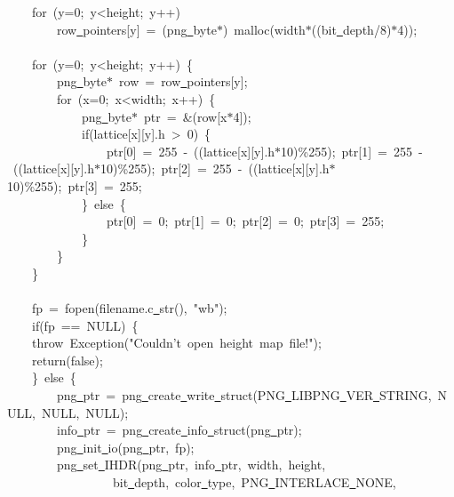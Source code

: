 {\ \ \ \ for\ (y=0;\ y<{}height;\ y++)\\
\ \ \ \ \ \ \ \ row\underline\ pointers[y]\ =\ (png\underline\ byte$\ast$)\ malloc(width$\ast$((bit\underline\ depth/8)$\ast$4));\\
\ \\
\ \ \ \ for\ (y=0;\ y<{}height;\ y++)\ \{\\
\ \ \ \ \ \ \ \ png\underline\ byte$\ast$\ row\ =\ row\underline\ pointers[y];\\
\ \ \ \ \ \ \ \ for\ (x=0;\ x<{}width;\ x++)\ \{\\
\ \ \ \ \ \ \ \ \ \ \ \ png\underline\ byte$\ast$\ ptr\ =\ \&(row[x$\ast$4]);\\
\ \ \ \ \ \ \ \ \ \ \ \ if(lattice[x][y].h\ >{}\ 0)\ \{\\
\ \ \ \ \ \ \ \ \ \ \ \ \ \ \ \ ptr[0]\ =\ 255\ -{}\ ((lattice[x][y].h$\ast$10)\%255);\ ptr[1]\ =\ 255\ -{}\ ((lattice[x][y].h$\ast$10)\%255);\ ptr[2]\ =\ 255\ -{}\ ((lattice[x][y].h$\ast$10)\%255);\ ptr[3]\ =\ 255;\\
\ \ \ \ \ \ \ \ \ \ \ \ \}\ else\ \{\\
\ \ \ \ \ \ \ \ \ \ \ \ \ \ \ \ ptr[0]\ =\ 0;\ ptr[1]\ =\ 0;\ ptr[2]\ =\ 0;\ ptr[3]\ =\ 255;\\
\ \ \ \ \ \ \ \ \ \ \ \ \}\\
\ \ \ \ \ \ \ \ \}\\
\ \ \ \ \}\\
\ \\
\ \ \ \ fp\ =\ fopen(filename.c\underline\ str(),\ "{}wb"{});\\
\ \ \ \ if(fp\ ==\ NULL)\ \{\\
\ \ \ \ throw\ Exception("{}Couldn't\ open\ height\ map\ file!"{});\\
\ \ \ \ return(false);\\
\ \ \ \ \}\ else\ \{\\
\ \ \ \ \ \ \ \ png\underline\ ptr\ =\ png\underline\ create\underline\ write\underline\ struct(PNG\underline\ LIBPNG\underline\ VER\underline\ STRING,\ NULL,\ NULL,\ NULL);\\
\ \ \ \ \ \ \ \ info\underline\ ptr\ =\ png\underline\ create\underline\ info\underline\ struct(png\underline\ ptr);\\
\ \ \ \ \ \ \ \ png\underline\ init\underline\ io(png\underline\ ptr,\ fp);\\
\ \ \ \ \ \ \ \ png\underline\ set\underline\ IHDR(png\underline\ ptr,\ info\underline\ ptr,\ width,\ height,\\
\ \ \ \ \ \ \ \ \ \ \ \ \ \ \ \ \ bit\underline\ depth,\ color\underline\ type,\ PNG\underline\ INTERLACE\underline\ NONE,\\
}
